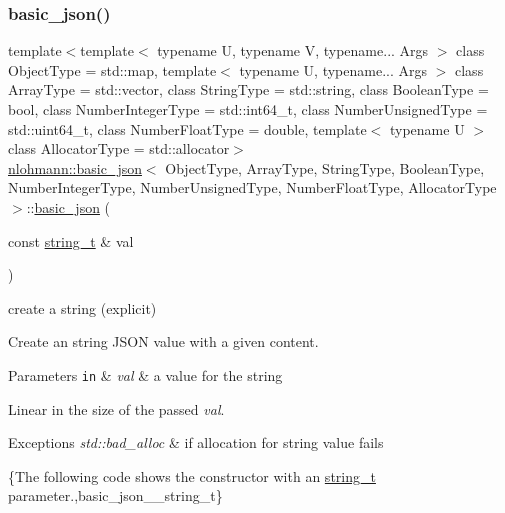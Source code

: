 \subsubsection{\texorpdfstring{basic\+\_\+json()}{basic\_json()}\hspace{0.1cm}{\footnotesize\ttfamily [7/23]}}
{\footnotesize\ttfamily template$<$template$<$ typename U, typename V, typename... Args $>$ class Object\+Type = std\+::map, template$<$ typename U, typename... Args $>$ class Array\+Type = std\+::vector, class String\+Type  = std\+::string, class Boolean\+Type  = bool, class Number\+Integer\+Type  = std\+::int64\+\_\+t, class Number\+Unsigned\+Type  = std\+::uint64\+\_\+t, class Number\+Float\+Type  = double, template$<$ typename U $>$ class Allocator\+Type = std\+::allocator$>$ \\
\hyperlink{classnlohmann_1_1basic__json}{nlohmann\+::basic\+\_\+json}$<$ Object\+Type, Array\+Type, String\+Type, Boolean\+Type, Number\+Integer\+Type, Number\+Unsigned\+Type, Number\+Float\+Type, Allocator\+Type $>$\+::\hyperlink{classnlohmann_1_1basic__json}{basic\+\_\+json} (\begin{DoxyParamCaption}\item[{const \hyperlink{classnlohmann_1_1basic__json_ab63e618bbb0371042b1bec17f5891f42}{string\+\_\+t} \&}]{val }\end{DoxyParamCaption})\hspace{0.3cm}{\ttfamily [inline]}}



create a string (explicit) 

Create an string J\+S\+ON value with a given content.


\begin{DoxyParams}[1]{Parameters}
\mbox{\tt in}  & {\em val} & a value for the string\\
\hline
\end{DoxyParams}
Linear in the size of the passed {\itshape val}.


\begin{DoxyExceptions}{Exceptions}
{\em std\+::bad\+\_\+alloc} & if allocation for string value fails\\
\hline
\end{DoxyExceptions}
\{The following code shows the constructor with an \hyperlink{classnlohmann_1_1basic__json_ab63e618bbb0371042b1bec17f5891f42}{string\+\_\+t} parameter.,basic\+\_\+json\+\_\+\+\_\+string\+\_\+t\}

